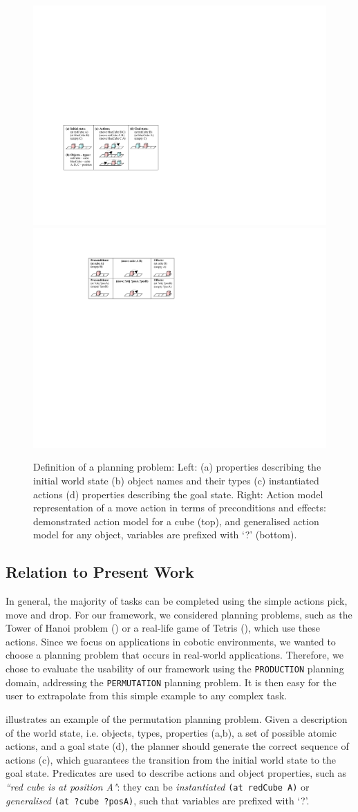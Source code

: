 \begin{figure}[!h]
	\centering
	\includegraphics[width=0.48\linewidth]{figures/planning-permutation}
	\includegraphics[width=0.48\linewidth]{figures/schema-logic}
	\caption{Definition of a planning problem: Left: (a) properties describing the initial world state (b) object names and their types (c) instantiated actions (d) properties describing the goal state. Right: Action model representation of a move action in terms of preconditions and effects: demonstrated action model for a cube (top), and generalised action model for any object, variables are prefixed with `?' (bottom).}
	\label{fig:action}
\end{figure}
\subsection{Relation to Present Work}
In general, the majority of tasks can be completed using the simple actions pick, move and drop. For our framework, we considered planning problems, such as the Tower of Hanoi problem (\cite{douglas1985metamagical}) or a real-life game of Tetris (\cite{tetris}), which use these actions. Since we focus on applications in cobotic environments, we wanted to choose a planning problem that occurs in real-world applications. Therefore, we chose to evaluate the usability of our framework using the \texttt{PRODUCTION} planning domain, addressing the \texttt{PERMUTATION} planning problem. It is then easy for the user to extrapolate from this simple example to any complex task.

 illustrates an example of the permutation planning problem. Given a description of the world state, i.e. objects, types, properties (a,b), a set of possible atomic actions, and a goal state (d), the planner should generate the correct sequence of actions (c), which guarantees the transition from the initial world state to the goal state. Predicates are used to describe actions and object properties, such as \textit{``red cube is at position A"}: they can be \textit{instantiated} \texttt{(at redCube A)} or \textit{generalised} \texttt{(at ?cube ?posA)}, such that variables are prefixed with `?'.

